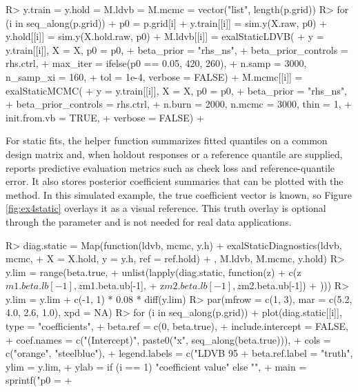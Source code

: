 \documentclass{jss}
\begin{document}
\begin{CodeChunk}
\begin{CodeInput}
R> y.train = y.hold = M.ldvb = M.mcmc = vector("list", length(p.grid))
R> for (i in seq_along(p.grid)) {
+     p0 = p.grid[i]
+     y.train[[i]] = sim.y(X.raw, p0)
+     y.hold[[i]] = sim.y(X.hold.raw, p0)
+     M.ldvb[[i]] = exalStaticLDVB(
+                    y = y.train[[i]], X = X, p0 = p0,
+                    beta_prior = "rhs_ns",
+                    beta_prior_controls = rhs.ctrl,
+                    max_iter = ifelse(p0 == 0.05, 420, 260),
+                    n.samp = 3000, n_samp_xi = 160,
+                    tol = 1e-4, verbose = FALSE)
+     M.mcmc[[i]] = exalStaticMCMC(
+                    y = y.train[[i]], X = X, p0 = p0,
+                    beta_prior = "rhs_ns",
+                    beta_prior_controls = rhs.ctrl,
+                    n.burn = 2000, n.mcmc = 3000, thin = 1,
+                    init.from.vb = TRUE,
+                    verbose = FALSE)
+   }
\end{CodeInput}
\end{CodeChunk}

For static fits, the helper function  summarizes fitted quantiles on a common design matrix and, when holdout responses or a reference quantile are supplied, reports predictive evaluation metrics such as check loss and reference-quantile error. It also stores posterior coefficient summaries that can be plotted with the  method. In this simulated example, the true coefficient vector is known, so Figure \ref{fig:ex4static} overlays it as a visual reference. This truth overlay is optional through the parameter  and is not needed for real data applications.

\begin{CodeChunk}
\begin{CodeInput}
R> diag.static = Map(function(ldvb, mcmc, y.h) {
+     exalStaticDiagnostics(ldvb, mcmc,
+                           X = X.hold, y = y.h, ref = ref.hold)
+   }, M.ldvb, M.mcmc, y.hold)
R> y.lim = range(beta.true,
+                unlist(lapply(diag.static, function(z) {
+                  c(z$m1.beta.lb[-1], z$m1.beta.ub[-1],
+                    z$m2.beta.lb[-1], z$m2.beta.ub[-1])
+                })))
R> y.lim = y.lim + c(-1, 1) * 0.08 * diff(y.lim)
R> par(mfrow = c(1, 3), mar = c(5.2, 4.0, 2.6, 1.0), xpd = NA)
R> for (i in seq_along(p.grid)) {
+     plot(diag.static[[i]], type = "coefficients",
+          beta.ref = c(0, beta.true),
+          include.intercept = FALSE,
+          coef.names = c("(Intercept)", paste0("x", seq_along(beta.true))),
+          cols = c("orange", "steelblue"),
+          legend.labels = c("LDVB 95%
+          beta.ref.label = "truth", ylim = y.lim,
+          ylab = if (i == 1) "coefficient value" else "",
+          main = sprintf("p0 = %
+   }
\end{CodeInput}
\end{CodeChunk}
\end{document}
